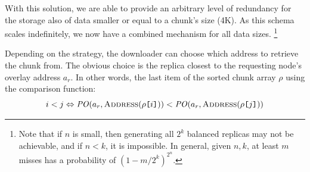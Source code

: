\documentclass[manuscript,screen,review]{acmart}
\newcommand{\idx}[1]{\texttt{[}\/#1\/\texttt{]}}
\begin{document}
With this solution, we are able to provide an arbitrary level of redundancy for the storage also of data smaller or equal to a chunk's size (4K). As this schema scales indefinitely, we now have a combined mechanism for all data sizes.%
%
%
\footnote{Note that if $n$ is small, then generating all $2^k$ balanced replicas may not be achievable, and if $n<k$, it is impossible.
In general, given $n, k$, at least $m$ misses has a probability of $(1 - m/2^k)^{2^n}$.}

Depending on the strategy, the downloader can choose which  address to retrieve the chunk from. The obvious choice is the replica closest to the requesting node's overlay address $a_r$. In other words, the last item of the sorted chunk array $\rho$ using the comparison function:
\begin{equation}
  i<j\Leftrightarrow    	
  \mathit{PO}(a_r,
  \textsc{Address}(\rho\idx{i}))
  <\mathit{PO}(a_r,
  \textsc{Address}(\rho\idx{j}))
\end{equation}


\end{document}
